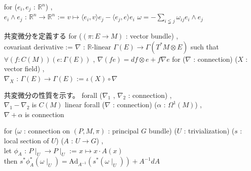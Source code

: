 \begin{Theorem}
\itemdefi
  for (\(e_i , e_j\) : \(\mathbb{R}^n\)) ,\\
  \(e_i \wedge e_j\) : \(\mathbb{R}^n \to \mathbb{R}^n\) := \(v \mapsto \langle e_i , v \rangle e_j - \langle e_j , e \rangle e_i\)
\itemdefi
  \(\omega = - \sum_{i \lneqq j} \omega_{ij} e_i \wedge e_j\)
\end{Theorem}

\begin{Definition}
\itemnote
  共変微分を定義する
\itemdefi
  for (\((\pi : E \to M)\) : vector bundle) ,\\
  covariant derivative := \(\nabla\) : \(\mathbb{R}\text{-linear } \Gamma(E) \to \Gamma(T^*M \otimes E)\) such that \(\forall (f : C(M)) (e : \Gamma(E))\) , \(\nabla(f e) = d f \otimes e + f \nabla e\)
\itemdefi
  for (\(\nabla\) : connection) (\(X\) : vector field) ,\\
  \(\nabla_X\) : \(\Gamma(E) \to \Gamma(E)\) := \(\iota (X) \circ \nabla\)
\end{Definition}

\begin{Theorem}
\itemnote
  共変微分の性質を示す。
\itemprop
  forall (\(\nabla_1\) , \(\nabla_2\) : connection) ,\\
  \(\nabla_1 - \nabla_2\) is \(C(M)\) linear
\itemprop
  forall (\(\nabla\) : connection) (\(\alpha\) : \(\Omega^1(M)\)) ,\\
  \(\nabla + \alpha\) is connection
\end{Theorem}

\begin{Theorem}
\itemnote
  for (\(\omega\) : connection on \((P , M , \pi)\) : principal \(G\) bundle) (\(U\) : trivialization) (\(s\) : local section of \(U\)) (\(A\) : \(U \to G\)) ,\\
  let \(\phi_A\) : \(P \mid_{U} \to P \mid_{U}\) := \(x \mapsto x \cdot A(x)\) \\
  then \(s^* \phi_A^* (\omega \mid_{U}) = \text{Ad}_{A^{-1}} (s^* (\omega \mid_{U})) + A^{-1}dA\)
\end{Theorem}

